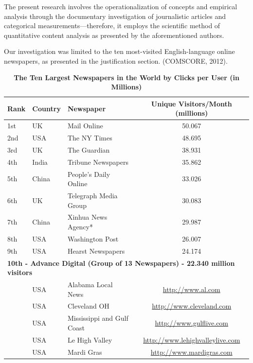 The present research involves the operationalization of concepts and empirical analysis through the documentary investigation of journalistic articles and categorical measurements—therefore, it employs the scientific method of quantitative content analysis as presented by the aforementioned authors.

Our investigation was limited to the ten most-visited English-language online newspapers, as presented in the justification section. (COMSCORE, 2012).

\begin{table}[ht]
    \centering
    \caption{\textbf{The Ten Largest Newspapers in the World by Clicks per User (in Millions)}} %
    \begin{tabular}{lllc}
        \toprule
        \textbf{Rank} & \textbf{Country} & \textbf{Newspaper} & \textbf{Unique Visitors/Month (millions)} \\
        \midrule
        1st  & UK    & Mail Online            & 50.067 \\
        2nd  & USA   & The NY Times           & 48.695 \\
        3rd  & UK    & The Guardian           & 38.931 \\
        4th  & India & Tribune Newspapers     & 35.862 \\
        5th  & China & People's Daily Online  & 33.026 \\
        6th  & UK    & Telegraph Media Group  & 30.083 \\
        7th  & China & Xinhua News Agency*    & 29.987 \\
        8th  & USA   & Washington Post        & 26.007 \\
        9th  & USA   & Hearst Newspapers      & 24.174 \\
        \midrule
        \multicolumn{4}{l}{\textbf{10th - Advance Digital (Group of 13 Newspapers) - 22.340 million visitors}} \\
        \midrule
        & USA & Alabama Local News              & \url{http://www.al.com} \\
        & USA & Cleveland OH                    & \url{http://www.cleveland.com} \\
        & USA & Mississippi and Gulf Coast      & \url{http://www.gulflive.com} \\
        & USA & Le High Valley                  & \url{http://www.lehighvalleylive.com} \\
        & USA & Mardi Gras                      & \url{http://www.mardigras.com} \\

\end{tabular}
\end{table}
